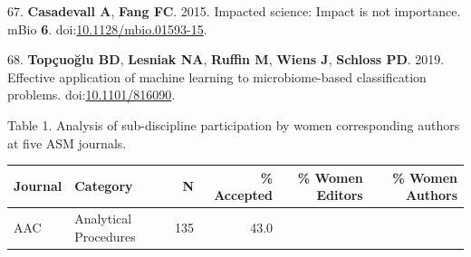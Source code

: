 \documentclass[11pt,]{article}
\begin{document}
\hypertarget{ref-Casadevall2015}{}
67. \textbf{Casadevall A}, \textbf{Fang FC}. 2015. Impacted science:
Impact is not importance. mBio \textbf{6}.
doi:\href{https://doi.org/10.1128/mbio.01593-15}{10.1128/mbio.01593-15}.

\hypertarget{ref-Topcuoglu2019}{}
68. \textbf{Topçuoğlu BD}, \textbf{Lesniak NA}, \textbf{Ruffin M},
\textbf{Wiens J}, \textbf{Schloss PD}. 2019. Effective application of
machine learning to microbiome-based classification problems.
doi:\href{https://doi.org/10.1101/816090}{10.1101/816090}.

\newpage

Table 1. Analysis of sub-discipline participation by women corresponding
authors at five ASM journals.

\begin{longtable}[]{@{}llrrrr@{}}
\toprule
\begin{minipage}[b]{0.06\columnwidth}\raggedright\strut
Journal\strut
\end{minipage} & \begin{minipage}[b]{0.43\columnwidth}\raggedright\strut
Category\strut
\end{minipage} & \begin{minipage}[b]{0.04\columnwidth}\raggedleft\strut
N\strut
\end{minipage} & \begin{minipage}[b]{0.08\columnwidth}\raggedleft\strut
\% Accepted\strut
\end{minipage} & \begin{minipage}[b]{0.11\columnwidth}\raggedleft\strut
\% Women Editors\strut
\end{minipage} & \begin{minipage}[b]{0.11\columnwidth}\raggedleft\strut
\% Women Authors\strut
\end{minipage}\tabularnewline
\midrule
\endhead
\begin{minipage}[t]{0.06\columnwidth}\raggedright\strut
AAC\strut
\end{minipage} & \begin{minipage}[t]{0.43\columnwidth}\raggedright\strut
Analytical Procedures\strut
\end{minipage} & \begin{minipage}[t]{0.04\columnwidth}\raggedleft\strut
135\strut
\end{minipage} & \begin{minipage}[t]{0.08\columnwidth}\raggedleft\strut
43.0\strut
\end{minipage} & \begin{minipage}[t]{0.11\columnwidth}\raggedleft\strut

\end{minipage}
\end{longtable}
\end{document}
